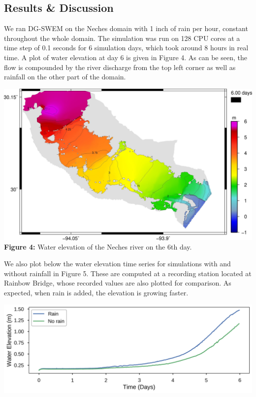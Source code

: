 \documentclass[american]{article}
\begin{document}
\begin{multicols}{3}
\section*{Results \& Discussion}
\noindent We ran DG-SWEM on the Neches domain with 1 inch of rain per hour, constant throughout the whole domain. The simulation was run on 128 CPU cores at a time step of 0.1 seconds for 6 simulation days, which took around 8 hours in real time. A plot of water elevation at day 6 is given in Figure 4. As can be seen, the flow is compounded by the river discharge from the top left corner as well as rainfall on the other part of the domain.
\begin{center}
    \vspace{0.5cm}
    \includegraphics[width=0.95 \linewidth]{media/rain.jpg}
    \textbf{Figure 4:} Water elevation of the Neches river on the 6th day.
\end{center}
We also plot below the water elevation time series for simulations with and without rainfall in Figure 5. These are computed at a recording station located at Rainbow Bridge, whose recorded values are also plotted for comparison. As expected, when rain is added, the elevation is growing faster.
\begin{center}
    \vspace{0.5cm}
    \includegraphics[width=0.95 \linewidth]{media/rainbow_bridge.png}

\end{center}
\end{multicols}
\end{document}
